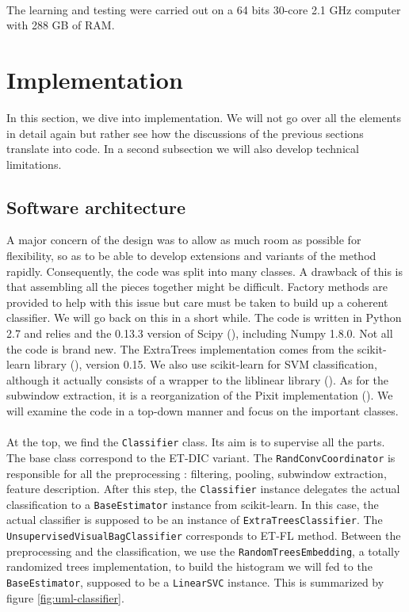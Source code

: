 \documentclass[a4paper]{report}
\begin{document}
	\paragraph{}
	The learning and testing were carried out on a 64 bits 30-core 2.1 GHz computer with 288 GB of RAM. %
	
	
	\section{Implementation}
	
	In this section, we dive into implementation. We will not go over all the elements in detail again but rather see how the discussions of the previous sections translate into code. In a second subsection we will also develop technical limitations.
		\subsection{Software architecture}
		A major concern of the design was to allow as much room as possible for flexibility, so as to be able to develop extensions and variants of the method rapidly. Consequently, the code was split into many classes. A drawback of this is that assembling all the pieces together might be difficult. Factory methods are provided to help with this issue but care must be taken to build up a coherent classifier. We will go back on this in a short while. 
		The code is written in Python 2.7 and relies and the 0.13.3 version of Scipy (\cite{scipy}), including Numpy 1.8.0. Not all the code is brand new. The ExtraTrees implementation comes from the scikit-learn library (\cite{sklearn}), version 0.15. We also use scikit-learn for SVM classification, although it actually consists of a wrapper to the liblinear library (\cite{}). As for the subwindow extraction, it is a reorganization of the Pixit implementation (\cite{}).
		We will examine the code in a top-down manner and focus on the important classes.
		\paragraph{}
		At the top, we find the \texttt{Classifier} class. Its aim is to supervise all the parts. The base class correspond to the ET-DIC variant. The \texttt{RandConvCoordinator} is responsible for all the preprocessing : filtering, pooling, subwindow extraction, feature description. After this step, the \texttt{Classifier} instance delegates the actual classification to a \texttt{BaseEstimator} instance from scikit-learn. In this case, the actual classifier is supposed to be an instance of \texttt{ExtraTreesClassifier}. The \texttt{UnsupervisedVisualBagClassifier} corresponds to ET-FL method. Between the preprocessing and the classification, we use the \texttt{RandomTreesEmbedding}, a totally randomized trees implementation, to build the histogram we will fed to the \texttt{BaseEstimator}, supposed to be a \texttt{LinearSVC} instance.
		This is summarized by figure \ref{fig:uml-classifier}.
		
\end{document}
